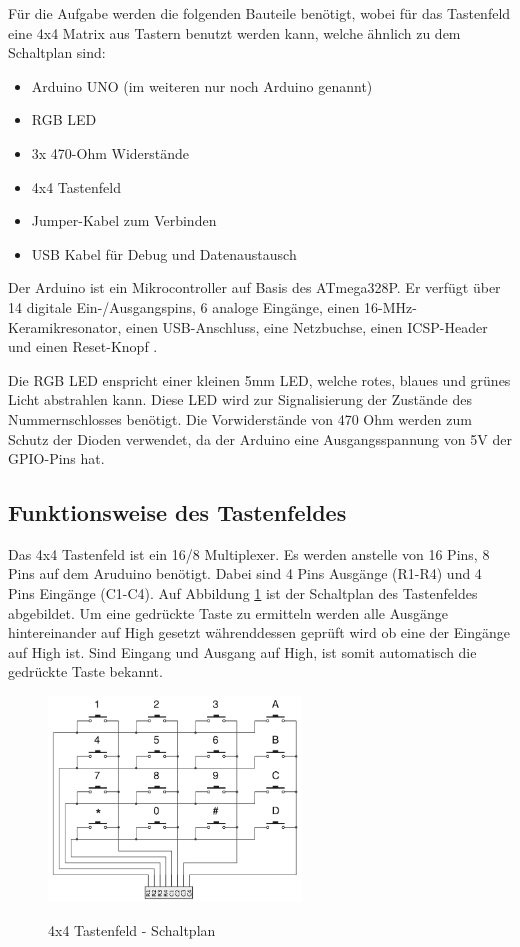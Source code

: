 Für die Aufgabe werden die folgenden Bauteile benötigt, wobei für das Tastenfeld eine 4x4 Matrix aus Tastern benutzt werden kann, welche ähnlich zu dem Schaltplan sind:

\begin{itemize}
    \item Arduino UNO (im weiteren nur noch Arduino genannt)
    \item RGB LED
    \item 3x 470-Ohm Widerstände
    \item 4x4 Tastenfeld
    \item Jumper-Kabel zum Verbinden
    \item USB Kabel für Debug und Datenaustausch
\end{itemize}

Der Arduino ist ein Mikrocontroller auf Basis des ATmega328P. Er verfügt über 14 digitale Ein-/Ausgangspins, 6 analoge Eingänge, einen 16-MHz-Keramikresonator, einen USB-Anschluss, eine Netzbuchse, einen ICSP-Header und einen Reset-Knopf \cite{online:arduino}.

Die RGB LED enspricht einer kleinen 5mm LED, welche rotes, blaues und grünes Licht abstrahlen kann. Diese LED wird zur Signalisierung der Zustände des Nummernschlosses benötigt. Die Vorwiderstände von 470 Ohm werden zum Schutz der Dioden verwendet, da der Arduino eine Ausgangsspannung von 5V der GPIO-Pins hat. 

\subsection{Funktionsweise des Tastenfeldes}

Das 4x4 Tastenfeld ist ein 16/8 Multiplexer. Es werden anstelle von 16 Pins, 8 Pins auf dem Aruduino benötigt. Dabei sind 4 Pins Ausgänge (R1-R4) und 4 Pins Eingänge (C1-C4). Auf Abbildung \ref{fig:schematic} ist der Schaltplan des Tastenfeldes abgebildet. Um eine gedrückte Taste zu ermitteln werden alle Ausgänge hintereinander auf High gesetzt währenddessen geprüft wird ob eine der Eingänge auf High ist. Sind Eingang und Ausgang auf High, ist somit automatisch die gedrückte Taste bekannt. 

\begin{figure}[H]
    \caption{4x4 Tastenfeld - Schaltplan}
    \centering
    \includegraphics[width=0.6\textwidth]{images/4x4-keypad.png}
    \label{fig:schematic}
\end{figure}

